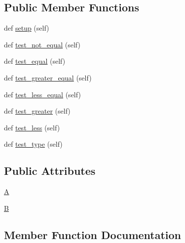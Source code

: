 \subsection*{Public Member Functions}
\begin{DoxyCompactItemize}
\item 
def \hyperlink{classnumpy_1_1core_1_1tests_1_1test__defchararray_1_1TestComparisons_a02835b6679f617d88ba9c270fcfa065e}{setup} (self)
\item 
def \hyperlink{classnumpy_1_1core_1_1tests_1_1test__defchararray_1_1TestComparisons_aa46d8b5e6cafa9cd27771ab91a3653d1}{test\+\_\+not\+\_\+equal} (self)
\item 
def \hyperlink{classnumpy_1_1core_1_1tests_1_1test__defchararray_1_1TestComparisons_a92f16a41330ab2bd919991e8cf4b2346}{test\+\_\+equal} (self)
\item 
def \hyperlink{classnumpy_1_1core_1_1tests_1_1test__defchararray_1_1TestComparisons_a2e83bfc784dc0fdb8e932eb17f72e0a5}{test\+\_\+greater\+\_\+equal} (self)
\item 
def \hyperlink{classnumpy_1_1core_1_1tests_1_1test__defchararray_1_1TestComparisons_adc72cec0aab10d9e3fbb5df17c09d9e9}{test\+\_\+less\+\_\+equal} (self)
\item 
def \hyperlink{classnumpy_1_1core_1_1tests_1_1test__defchararray_1_1TestComparisons_ab831597abe28daf1fd724da5d5ff8cd7}{test\+\_\+greater} (self)
\item 
def \hyperlink{classnumpy_1_1core_1_1tests_1_1test__defchararray_1_1TestComparisons_abbe25b0c1d637aa3a38a259c7353567f}{test\+\_\+less} (self)
\item 
def \hyperlink{classnumpy_1_1core_1_1tests_1_1test__defchararray_1_1TestComparisons_a7258e0bdff2dc9cbdf6309c09cd9ecd8}{test\+\_\+type} (self)
\end{DoxyCompactItemize}
\subsection*{Public Attributes}
\begin{DoxyCompactItemize}
\item 
\hyperlink{classnumpy_1_1core_1_1tests_1_1test__defchararray_1_1TestComparisons_a179bb22b7b55dad805cf5ede36499014}{A}
\item 
\hyperlink{classnumpy_1_1core_1_1tests_1_1test__defchararray_1_1TestComparisons_a80bd9d46733b57f07419e57679ca7576}{B}
\end{DoxyCompactItemize}


\subsection{Member Function Documentation}
\mbox{\label{classnumpy_1_1core_1_1tests_1_1test__defchararray_1_1TestComparisons_a02835b6679f617d88ba9c270fcfa065e}} 
